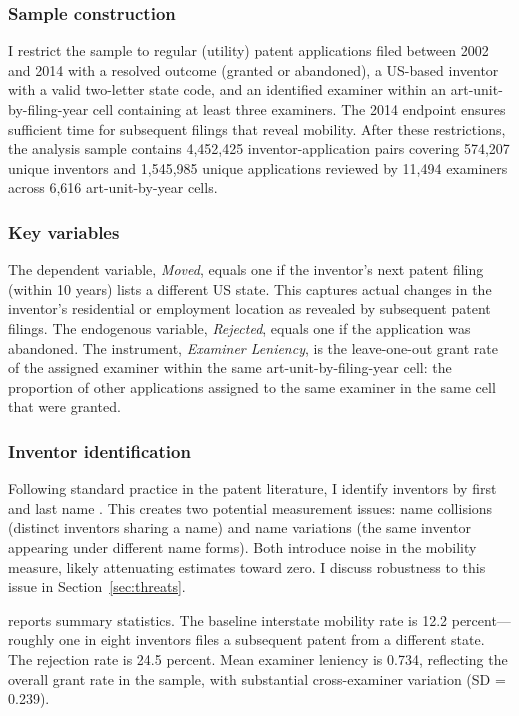 \documentclass[12pt]{article}
\begin{document}
\subsubsection*{Sample construction} I restrict the sample to regular (utility) patent applications filed between 2002 and 2014 with a resolved outcome (granted or abandoned), a US-based inventor with a valid two-letter state code, and an identified examiner within an art-unit-by-filing-year cell containing at least three examiners. The 2014 endpoint ensures sufficient time for subsequent filings that reveal mobility. After these restrictions, the analysis sample contains 4,452,425 inventor-application pairs covering 574,207 unique inventors and 1,545,985 unique applications reviewed by 11,494 examiners across 6,616 art-unit-by-year cells.

\subsubsection*{Key variables} The dependent variable, \textit{Moved}, equals one if the inventor's next patent filing (within 10 years) lists a different US state. This captures actual changes in the inventor's residential or employment location as revealed by subsequent patent filings. The endogenous variable, \textit{Rejected}, equals one if the application was abandoned. The instrument, \textit{Examiner Leniency}, is the leave-one-out grant rate of the assigned examiner within the same art-unit-by-filing-year cell: the proportion of other applications assigned to the same examiner in the same cell that were granted.

\subsubsection*{Inventor identification} Following standard practice in the patent literature, I identify inventors by first and last name \citep{trajtenberg2006}. This creates two potential measurement issues: name collisions (distinct inventors sharing a name) and name variations (the same inventor appearing under different name forms). Both introduce noise in the mobility measure, likely attenuating estimates toward zero. I discuss robustness to this issue in Section~\ref{sec:threats}.

 reports summary statistics. The baseline interstate mobility rate is 12.2 percent---roughly one in eight inventors files a subsequent patent from a different state. The rejection rate is 24.5 percent. Mean examiner leniency is 0.734, reflecting the overall grant rate in the sample, with substantial cross-examiner variation (SD = 0.239).
\end{document}
